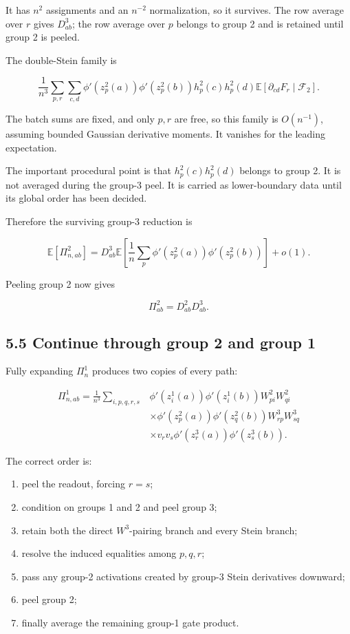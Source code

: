 It has \(n^2\) assignments and an \(n^{-2}\) normalization, so it survives.
The row average over \(r\) gives \(D^3_{ab}\); the row average over \(p\)
belongs to group 2 and is retained until group 2 is peeled.

The double-Stein family is

\[
\frac1{n^3}
\sum_{p,r}\sum_{c,d}
\phi'(z_p^2(a))\phi'(z_p^2(b))
h_p^2(c)h_p^2(d)
\mathbb E[\partial_{cd}F_r\mid\mathcal F_2].
\]


The batch sums are fixed, and only \(p,r\) are free, so this family is
\(O(n^{-1})\), assuming bounded Gaussian derivative moments. It vanishes for
the leading expectation.

The important procedural point is that
\(h_p^2(c)h_p^2(d)\) belongs to group 2. It is not averaged during the
group-3 peel. It is carried as lower-boundary data until its global order has
been decided.

Therefore the surviving group-3 reduction is

\[
\mathbb E[\Pi^2_{n,ab}]
=
D^3_{ab}
\mathbb E\left[
\frac1n\sum_p
\phi'(z_p^2(a))\phi'(z_p^2(b))
\right]
+o(1).
\]


Peeling group 2 now gives

\[
\boxed{\Pi^2_{ab}=D^2_{ab}D^3_{ab}.}
\]


\subsection*{5.5 Continue through group 2 and group 1}


Fully expanding \(\Pi^1_n\) produces two copies of every path:

\[
\begin{aligned}
\Pi^1_{n,ab}
=
\frac1{n^3}
\sum_{i,p,q,r,s}
&\phi'(z_i^1(a))\phi'(z_i^1(b))
W^2_{pi}W^2_{qi}
\\
&\times
\phi'(z_p^2(a))\phi'(z_q^2(b))
W^3_{rp}W^3_{sq}
\\
&\times
v_rv_s
\phi'(z_r^3(a))\phi'(z_s^3(b)).
\end{aligned}
\]


The correct order is:

\begin{enumerate}
\item peel the readout, forcing \(r=s\);
\item condition on groups 1 and 2 and peel group 3;
\item retain both the direct \(W^3\)-pairing branch and every Stein branch;
\item resolve the induced equalities among \(p,q,r\);
\item pass any group-2 activations created by group-3 Stein derivatives downward;
\item peel group 2;
\item finally average the remaining group-1 gate product.
\end{enumerate}


